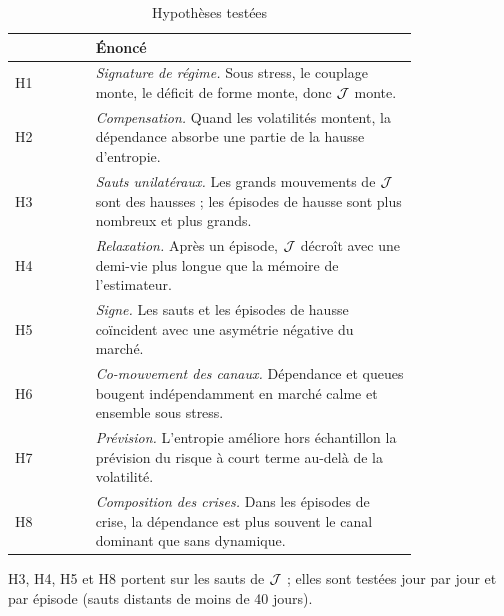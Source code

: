 \begin{table}[p]\centering\small
\caption{Hypothèses testées}\label{tab:hyp}
\begin{tabular}{@{}lp{0.8\linewidth}@{}}\toprule
& Énoncé \\\midrule
H1 & \emph{Signature de régime.} Sous stress, le couplage monte, le déficit de forme monte, donc $\mathcal{J}$ monte. \\
H2 & \emph{Compensation.} Quand les volatilités montent, la dépendance absorbe une partie de la hausse d'entropie. \\
H3 & \emph{Sauts unilatéraux.} Les grands mouvements de $\mathcal{J}$ sont des hausses ; les épisodes de hausse sont plus nombreux et plus grands. \\
H4 & \emph{Relaxation.} Après un épisode, $\mathcal{J}$ décroît avec une demi-vie plus longue que la mémoire de l'estimateur. \\
H5 & \emph{Signe.} Les sauts et les épisodes de hausse coïncident avec une asymétrie négative du marché. \\
H6 & \emph{Co-mouvement des canaux.} Dépendance et queues bougent indépendamment en marché calme et ensemble sous stress. \\
H7 & \emph{Prévision.} L'entropie améliore hors échantillon la prévision du risque à court terme au-delà de la volatilité. \\
H8 & \emph{Composition des crises.} Dans les épisodes de crise, la dépendance est plus souvent le canal dominant que sans dynamique. \\
\bottomrule\end{tabular}
\par\medskip\begin{minipage}{0.95\linewidth}\footnotesize
H3, H4, H5 et H8 portent sur les sauts de $\mathcal{J}$ ; elles sont testées jour par jour et par épisode (sauts distants de moins de 40 jours).
\end{minipage}
\end{table}

